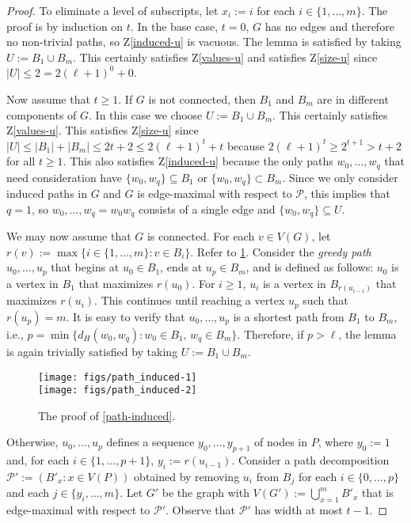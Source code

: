 \documentclass[kpfonts]{patmorin}
\theoremstyle{named}
\begin{document}
\begin{proof}
    To eliminate a level of subscripts, let $x_i:=i$ for each $i\in\{1,\ldots,m\}$. The proof is by induction on $t$. In the base case, $t=0$, $G$ has no edges and therefore no non-trivial paths, so Z\ref{induced-u} is vacuous. The lemma is satisfied by taking $U:=B_{1}\cup B_{m}$.  This certainly satisfies Z\ref{values-u} and satisfies Z\ref{size-u} since $|U|\le 2= 2(\ell+1)^0+0$.

    Now assume that $t\ge 1$. If $G$ is not connected, then $B_{1}$ and $B_{m}$ are in different components of $G$.  In this case we choose $U:=B_{1}\cup B_{m}$. This certainly satisfies Z\ref{values-u}.  This satisfies Z\ref{size-u} since $|U|\le|B_1|+|B_m|\le 2t+2 \le 2(\ell+1)^t+t$ because $2(\ell+1)^t \ge 2^{t+1}> t+2$ for all $t\ge 1$.  This also satisfies Z\ref{induced-u} because the only paths $w_0,\ldots,w_q$ that need consideration have $\{w_0,w_q\}\subseteq B_1$ or $\{w_0,w_q\}\subset B_m$.  Since we only consider induced paths in $G$ and $G$ is edge-maximal with respect to $\mathcal{P}$, this implies that $q=1$, so $w_0,\ldots,w_q=w_0w_q$ consists of a single edge and $\{w_0,w_q\}\subseteq U$.

    We may now assume that $G$ is connected. For each $v\in V(G)$, let $r(v):=\max\{i\in\{1,\ldots,m\}:v\in B_i\}$.  Refer to \cref{induced_path_fig}.  Consider the \emph{greedy path} $u_0,\ldots,u_p$ that begins at $u_0\in B_{1}$, ends at $u_p\in B_{m}$, and is defined as follows: $u_0$ is a vertex in $B_{1}$ that maximizes $r(u_0)$.  For $i\ge 1$, $u_i$ is a vertex in $B_{r(u_{i-1})}$ that maximizes $r(u_i)$.  This continues until reaching a vertex $u_p$ such that $r(u_p)=m$.   It is easy to verify that $u_0,\ldots,u_p$ is a shortest path from $B_{1}$ to $B_{m}$, i.e., $p=\min\{d_H(w_0,w_q): w_0\in B_1,\, w_q\in B_m\}$.  Therefore, if $p>\ell$, the lemma is again trivially satisfied by taking $U:=B_{1}\cup B_{m}$.

    \begin{figure}
      \begin{center}
        \texttt{[image: figs/path\_induced-1]} \\
        \texttt{[image: figs/path\_induced-2]} \\
      \end{center}
      \caption{The proof of \cref{path-induced}.}
      \label{induced_path_fig}
    \end{figure}

    Otherwise, $u_0,\ldots,u_p$ defines a sequence $y_0,\ldots,y_{p+1}$ of nodes in $P$, where $y_0:=1$ and, for each $i\in\{1,\ldots,p+1\}$, $y_{i}:=r(u_{i-1})$.  Consider a path decomposition $\mathcal{P'}:=(B'_x:x\in V(P))$  obtained by removing $u_i$ from $B_{j}$ for each $i\in\{0,\ldots,p\}$ and each $j\in\{y_i,\ldots,m\}$. Let $G'$ be the graph with $V(G'):=\bigcup_{x=1}^m B'_x$ that is edge-maximal with respect to $\mathcal{P}'$.  Observe that $\mathcal{P'}$ has width at most $t-1$.


\end{proof}
\end{document}
